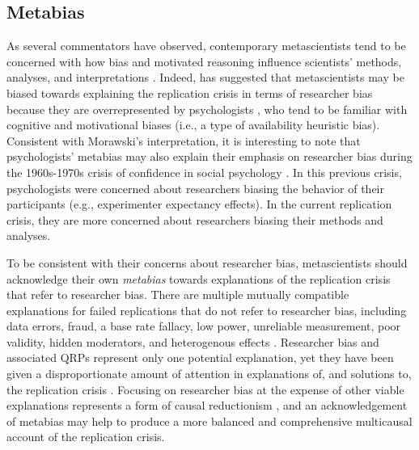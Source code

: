 \documentclass[authordate, meta, issue]{jote-new-article}
\begin{document}
\subsection{Metabias}



As several commentators have observed, contemporary metascientists tend to be concerned with how bias and motivated reasoning influence scientists’ methods, analyses, and interpretations \parencites{Field2021}{Flis2019}{Morawski2019}{Morawski2022}[p. 7]{Peterson2020}[for examples, see][]{Bishop2020}[chapter 1]{Chambers2017}{Chambers2022}{Hardwicke2023}{Ioannidis2014}{Munafò2017}{Nosek2012}[p. 153]{Simmons2021}. Indeed, \textcite{Morawski2022} has suggested that metascientists may be biased towards explaining the replication crisis in terms of researcher bias because they are overrepresented by psychologists \parencites{Moody2022}[see also][]{Flis2019}{Malich2022}, who tend to be familiar with cognitive and motivational biases (i.e., a type of availability heuristic bias). Consistent with Morawski’s interpretation, it is interesting to note that psychologists’ metabias may also explain their emphasis on researcher bias during the 1960s-1970s crisis of confidence in social psychology \parencites[p. 600]{Peterson2021}{Rosnow1983}. In this previous crisis, psychologists were concerned about researchers biasing the behavior of their participants (e.g., experimenter expectancy effects). In the current replication crisis, they are more concerned about researchers biasing their methods and analyses.



To be consistent with their concerns about researcher bias, metascientists should acknowledge their own \emph{metabias} towards explanations of the replication crisis that refer to researcher bias. There are multiple mutually compatible explanations for failed replications that do not refer to researcher bias, including data errors, fraud, a base rate fallacy, low power, unreliable measurement, poor validity, hidden moderators, and heterogenous effects \parencites[e.g.,][]{Bird2020}{Boeck2018}{Fabrigar2020}{Maxwell2015}{Rubin2021a}{Stanley2014}. Researcher bias and associated QRPs represent only one potential explanation, yet they have been given a disproportionate amount of attention in explanations of, and solutions to, the replication crisis \parencites[e.g.,][]{Hardwicke2023}{Munafò2017}[p. 372]{Schimmack2020}. Focusing on researcher bias at the expense of other viable explanations represents a form of causal reductionism \parencites[p. 17]{Devezer2019}, and an acknowledgement of metabias may help to produce a more balanced and comprehensive multicausal account of the replication crisis.
\end{document}
